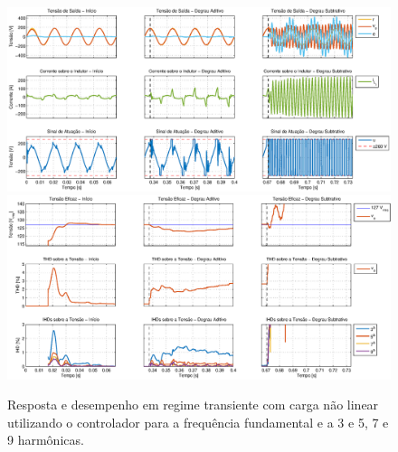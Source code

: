 \documentclass[repeatfields,oneside,overleaf]{tcc}
\begin{document}
\begin{figure}[h]
    \centering
    \caption{Resposta e desempenho em regime transiente com carga não linear utilizando o controlador para a frequência fundamental e a 3{\textordfeminine} e 5{\textordfeminine}, 7{\textordfeminine} e 9{\textordfeminine} harmônicas.}
    \includegraphics[trim={80 50 1 20}, clip, width=\linewidth]{fig/closed_9.eps}
    \\\vspace{0.475cm}
    \includegraphics[trim={80 20 1 20}, clip, width=\linewidth]{fig/harm_9.eps}
    \label{fig:closed_9_app}
\end{figure}

\annex

\printbibliography
\end{document}
